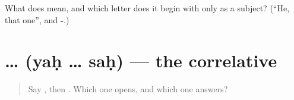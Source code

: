 \begin{tcolorbox}[breakable,colback=teal!4,colframe=teal!35!black,title={Before you move on}]
What does \textbf{} mean, and which letter does it begin with only as a subject? (\textquotedblleft{}He, that one\textquotedblright{}, and \textbf{-}.)
\end{tcolorbox}
\section[\texorpdfstring{\sk{यः} … \sk{सः} (yaḥ … saḥ)}{यः … सः (yaḥ … saḥ)}]{ …  (yaḥ … saḥ) — the correlative}

\label{lesson:SA-C53-yah-sah}



\begin{quote}
Say \textbf{}, then \textbf{}. Which one opens, and which one answers?
\end{quote}


